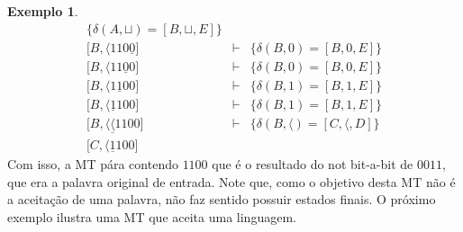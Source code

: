 \documentclass[a4paper]{article}
\theoremstyle{definition}
\newtheorem{Example}{Exemplo}
\begin{document}
\begin{Example}
\[\begin{array}{lcl}
                                                              \{\delta(A,\sqcup)
                                                              = [B,\sqcup, E]\}\\
        \lbrack B, \langle 110\underline{0} \rbrack & \vdash & \{\delta(B,0) =
                                                               [B,0, E]\} \\
        \lbrack B, \langle 11\underline{0}0 \rbrack & \vdash & \{\delta(B,0) =
                                                               [B,0, E]\} \\
        \lbrack B, \langle 1\underline{1}00 \rbrack & \vdash & \{\delta(B,1) =
                                                               [B,1, E]\} \\
        \lbrack B, \langle \underline{1}100 \rbrack & \vdash & \{\delta(B,1) =
                                                               [B,1, E]\} \\
        \lbrack B, \langle \underline{\langle}1100 \rbrack & \vdash & \{\delta(B,\langle) =
                                                               [C,\langle, D]\}
        \\
        \lbrack C , \langle  \underline{1}100 \rbrack & &
      \end{array}
    \]
    Com isso, a MT pára contendo $1100$ que é o resultado do not bit-a-bit de
    $0011$, que era a palavra original de entrada. Note que, como o objetivo
    desta MT não é a aceitação de uma palavra, não faz sentido possuir estados
    finais. O próximo exemplo ilustra uma MT que aceita uma linguagem.
 \end{Example}
\end{document}
